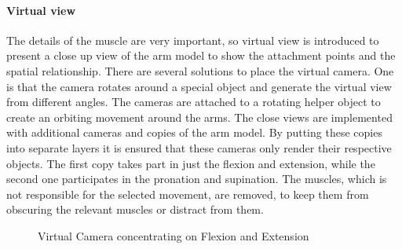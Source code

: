 \paragraph{Virtual view}
The details of the muscle are very important, so virtual view is introduced to present a close up view of the arm model to show the attachment points and the spatial relationship. There are several solutions to place the virtual camera. One is that the camera rotates around a special object and generate the virtual view from different angles. The cameras are attached to a rotating helper object to create an orbiting movement around the arms. 
The close views are implemented with additional cameras and copies of the arm model. By putting these copies into separate layers it is ensured that these cameras only render their respective objects. The first copy takes part in just the flexion and extension, while the second one participates in the pronation and supination. The muscles, which is not responsible for the selected movement, are removed, to keep them from obscuring the relevant muscles or distract from them.
\begin{figure}
	\centering
	
	\caption{Virtual Camera concentrating on Flexion and Extension}
	\label{fig:3-IMR:MuscleLearningVirtualCamera}
\end{figure}

